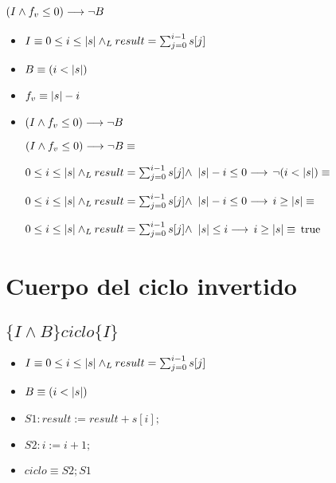 \documentclass{article}
\begin{document}
\subsection*{$(I \wedge f_{v} \leq 0) \longrightarrow \neg B$}

\begin{itemize}
    \item $I \equiv 0 \leq i \leq |s| \land _L result = \sum_{j=0}^{i-1} s[j]$
    \item $B \equiv (i < |s|)$
    \item $f_{v} \equiv |s|-i$
\end{itemize}

\begin{itemize}
    \item $(I \wedge f_{v} \leq 0) \longrightarrow \neg B$

        $(I \wedge f_{v} \leq 0) \longrightarrow \neg B \equiv$

        $0 \leq i \leq |s| \land _L result = \sum_{j=0}^{i-1} s[j] \wedge$
        $|s|-i \leq 0 \longrightarrow$
        $\neg (i < |s|) \equiv$

        $0 \leq i \leq |s| \land _L result = \sum_{j=0}^{i-1} s[j] \wedge$
        $|s|-i \leq 0 \longrightarrow$
        $i \geq |s| \equiv$

        $0 \leq i \leq |s| \land _L result = \sum_{j=0}^{i-1} s[j] \wedge$
        $|s| \leq i \longrightarrow$
        $i \geq |s| \equiv$
        $\mathrm{true}$

\end{itemize}


\section*{Cuerpo del ciclo invertido}

\subsection*{$\{I \wedge B\}  ciclo  \{ I \}$}

\begin{itemize}
    \item $I \equiv 0 \leq i \leq |s| \land _L result = \sum_{j=0}^{i-1} s[j]$
    \item $B \equiv (i < |s|)$
    \item $S1: result := result + s[i];$
    \item $S2: i := i + 1;$
    \item $ciclo \equiv S2; S1$
\end{itemize}
\end{document}
